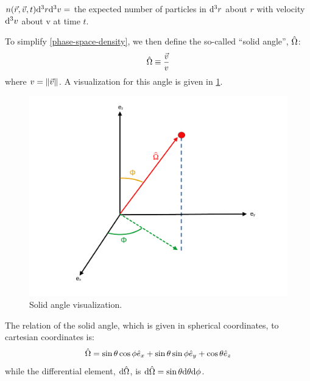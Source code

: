 \begin{definition}\label{phase-space-density}
  $n(\vec{r},\vec{v},t)\dd^3 r \dd^3 v=$ the expected number of particles in $\dd^3 r$ about $r$ with velocity $\dd^3 v$ about v at time $t$.
\end{definition}
To simplify \cref{phase-space-density}, we then define the so-called ``solid angle'', $\hat{\Omega}$:
\begin{equation} \label{eq:solid-angle}
  \hat{\Omega} \equiv \frac{\vec{v}}{v}
\end{equation}
where $v=\norm{\vec{v}}$.
A visualization for this angle is given in \cref{fig:solid-angle}.
\begin{figure}
  \centering
  \includegraphics[width=\textwidth]{figs/solid_angle.pdf}
  \caption{Solid angle visualization.}
  \label{fig:solid-angle}
\end{figure}
The relation of the solid angle, which is given in spherical coordinates, to cartesian coordinates is:
\begin{equation}
  \hat{\Omega} = \sin\theta \cos \phi \hat{e}_x+\sin\theta\sin\phi\hat{e}_y+\cos\theta\hat{e}_z
\end{equation}
while the differential element, $\dd \hat{\Omega}$, is $\dd \hat{\Omega}=\sin\theta \dd \theta \dd \phi$.

